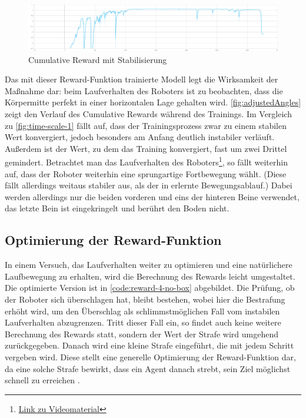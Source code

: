 \begin{figure}
    \centering
    \includegraphics[width=\textwidth]{Bilder/ml-agents/Environment_Cumulative Reward_adjustedAngles.pdf}
    \caption{Cumulative Reward mit Stabilisierung}
    \label{fig:adjustedAngles}
\end{figure}

Das mit dieser Reward-Funktion trainierte Modell legt die Wirksamkeit der Maßnahme dar: beim Laufverhalten des Roboters ist zu beobachten, dass die Körpermitte perfekt in einer horizontalen Lage gehalten wird.
\autoref{fig:adjustedAngles} zeigt den Verlauf des Cumulative Rewards während des Trainings.
Im Vergleich zu \autoref{fig:time-scale-1} fällt auf, dass der Trainingsprozess zwar zu einem stabilen Wert konvergiert, jedoch besonders am Anfang deutlich instabiler verläuft.
Außerdem ist der Wert, zu dem das Training konvergiert, fast um zwei Drittel gemindert.
Betrachtet man das Laufverhalten des Roboters\footnote{\href{https://github.com/yschiebelhut/studienarbeit-doc/raw/master/Videos/SpiderBotDemos/adjustedAngles.webm}{Link zu Videomaterial}}, so fällt weiterhin auf, dass der Roboter weiterhin eine sprungartige Fortbewegung wählt.
(Diese fällt allerdings weitaus stabiler aus, als der in \cite{waidner.2020} erlernte Bewegungsablauf.)
Dabei werden allerdings nur die beiden vorderen und eins der hinteren Beine verwendet, das letzte Bein ist eingekringelt und berührt den Boden nicht.

\subsection{Optimierung der Reward-Funktion}
In einem Versuch, das Laufverhalten weiter zu optimieren und eine natürlichere Laufbewegung zu erhalten, wird die Berechnung des Rewards leicht umgestaltet.
Die optimierte Version ist in \autoref{code:reward-4-no-box} abgebildet.
Die Prüfung, ob der Roboter sich überschlagen hat, bleibt bestehen, wobei hier die Bestrafung erhöht wird, um den Überschlag als schlimmstmöglichen Fall vom instabilen Laufverhalten abzugrenzen.
Tritt dieser Fall ein, so findet auch keine weitere Berechnung des Rewards statt, sondern der Wert der Strafe wird umgehend zurückgegeben.
Danach wird eine kleine Strafe eingeführt, die mit jedem Schritt vergeben wird.
Diese stellt eine generelle Optimierung der Reward-Funktion dar, da eine solche Strafe bewirkt, dass ein Agent danach strebt, sein Ziel möglichst schnell zu erreichen \cite{mlagentsReward}.

